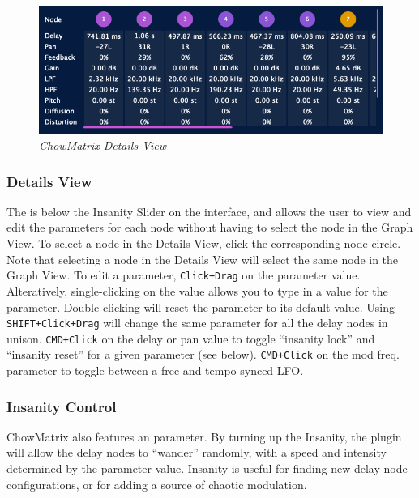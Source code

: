 \documentclass[landscape,twocolumn,a5paper]{manual}
\newcommand\shortcut[1]{\colorbox{highlightcolour}{\texttt{#1}}}
\begin{document}
\begin{figure}[ht]
    \center
    \includegraphics[width=0.85\columnwidth]{screenshots/DetailsView.png}
    \caption{\label{fig:details_view}{\it ChowMatrix Details View}}
\end{figure}

\subsubsection{Details View}
The  is below the Insanity Slider
on the interface, and allows the user to view and edit the
parameters for each node without having to select the node
in the Graph View. To select a node in the Details View,
click the corresponding node circle. Note that selecting
a node in the Details View will select the same node in
the Graph View.
\newpar
To edit a parameter, \shortcut{Click+Drag} on the parameter
value. Alteratively, single-clicking on the value allows
you to type in a value for the parameter. Double-clicking
will reset the parameter to its default value.
\newline
Using \shortcut{SHIFT+Click+Drag}
will change the same parameter for all the delay nodes in
unison. \shortcut{CMD+Click} on the delay or pan value to
toggle ``insanity lock'' and ``insanity reset'' for a given
parameter (see below). \shortcut{CMD+Click} on the mod
freq. parameter to toggle between a free and tempo-synced
LFO.

\subsubsection{Insanity Control}
ChowMatrix also features an  parameter.
By turning up the Insanity, the plugin will allow the delay
nodes to ``wander'' randomly, with a speed and intensity
determined by the parameter value. Insanity is useful for
finding new delay node configurations, or for adding a source
of chaotic modulation.
\end{document}
